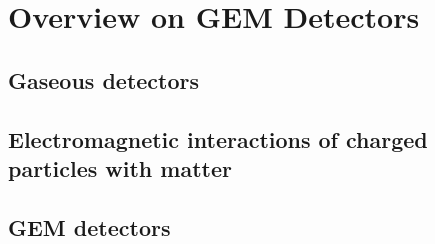 \documentclass[]{book}
\begin{document}
\chapter*{Overview on GEM Detectors}
\section{Gaseous detectors}
\section{Electromagnetic interactions of charged particles with matter}
\section{GEM detectors}
\end{document}
